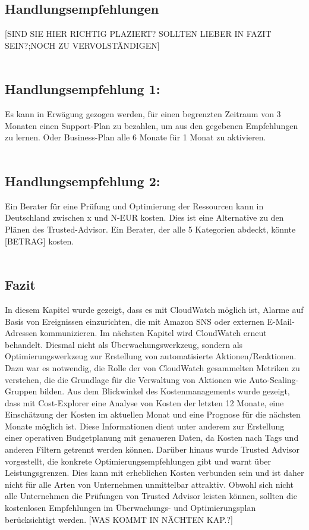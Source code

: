 \subsection*{Handlungsempfehlungen}
[SIND SIE HIER RICHTIG PLAZIERT? SOLLTEN LIEBER IN FAZIT SEIN?;NOCH ZU VERVOLSTÄNDIGEN]
\\\\
\subsection*{Handlungsempfehlung 1:} 
Es kann in Erwägung gezogen werden, für einen begrenzten Zeitraum von 3 Monaten einen Support-Plan zu bezahlen, um aus den gegebenen Empfehlungen zu lernen. Oder Business-Plan alle 6 Monate für 1 Monat zu aktivieren.  
\\\\
\subsection*{Handlungsempfehlung 2:} 
Ein Berater für eine Prüfung und Optimierung der Ressourcen kann in Deutschland zwischen x und N-EUR kosten. Dies ist eine Alternative zu den Plänen des Trusted-Advisor. Ein Berater, der alle 5 Kategorien abdeckt, könnte [BETRAG] kosten. %
\\\\
\subsection*{Fazit}
In diesem Kapitel wurde gezeigt, dass es mit CloudWatch möglich ist, Alarme auf Basis von Ereignissen einzurichten, die mit Amazon SNS oder externen E-Mail-Adressen kommunizieren. Im nächsten Kapitel wird CloudWatch erneut behandelt. Diesmal nicht als Überwachungswerkzeug, sondern als Optimierungswerkzeug zur Erstellung von automatisierte Aktionen/Reaktionen. Dazu war es notwendig, die Rolle der von CloudWatch gesammelten Metriken zu verstehen, die die Grundlage für die Verwaltung von Aktionen wie Auto-Scaling-Gruppen bilden. 
Aus dem Blickwinkel des Kostenmanagements wurde gezeigt, dass mit Cost-Explorer eine Analyse von Kosten der letzten 12 Monate, eine Einschätzung der Kosten im aktuellen Monat und eine Prognose für die nächsten Monate möglich ist. Diese Informationen dient unter anderem zur Erstellung einer operativen Budgetplanung mit genaueren Daten, da
Kosten nach Tags und anderen Filtern getrennt werden können.
Darüber hinaus wurde Trusted Advisor vorgestellt, die konkrete Optimierungsempfehlungen gibt und warnt über Leistungsgrenzen. Dies kann mit erheblichen Kosten verbunden sein und ist daher nicht für alle Arten von Unternehmen unmittelbar attraktiv. Obwohl sich nicht alle Unternehmen die Prüfungen von Trusted Advisor leisten können, sollten die kostenlosen Empfehlungen im Überwachungs- und Optimierungsplan berücksichtigt werden.
[WAS KOMMT IN NÄCHTEN KAP.?]

